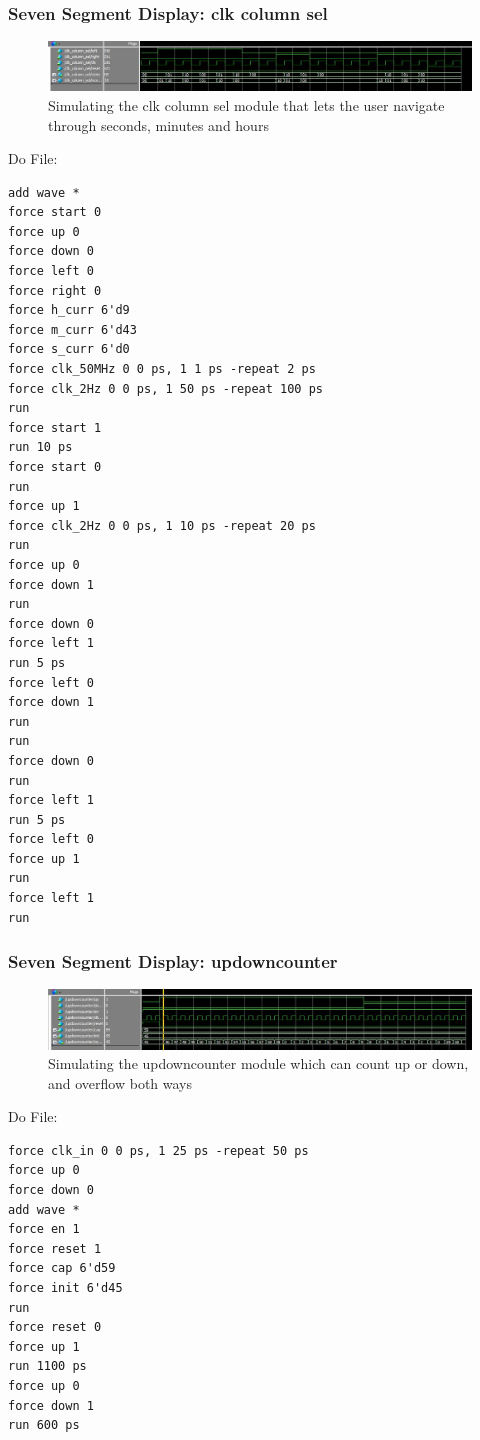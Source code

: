 \documentclass[a4paper]{article}
\begin{document}
\subsubsection{Seven Segment Display: clk column sel}
\begin{figure}[H]
    \includegraphics[width=0.8 \linewidth]{images/clkcolumnselsim.jpg}
    \caption{Simulating the clk column sel module that lets the user navigate through seconds, minutes and hours}
    \label{clkcolumnselsim}
\end{figure}

Do File:
\begin{Verbatim}
add wave *
force start 0
force up 0
force down 0
force left 0
force right 0
force h_curr 6'd9
force m_curr 6'd43
force s_curr 6'd0
force clk_50MHz 0 0 ps, 1 1 ps -repeat 2 ps
force clk_2Hz 0 0 ps, 1 50 ps -repeat 100 ps
run
force start 1
run 10 ps
force start 0
run
force up 1
force clk_2Hz 0 0 ps, 1 10 ps -repeat 20 ps
run
force up 0
force down 1
run
force down 0
force left 1
run 5 ps
force left 0
force down 1
run
run
force down 0
run
force left 1
run 5 ps
force left 0
force up 1
run
force left 1
run
\end{Verbatim}

\subsubsection{Seven Segment Display: updowncounter}
\begin{figure}[H]
    \includegraphics[width=0.8 \linewidth]{images/updowncountersim.JPG}
    \caption{Simulating the updowncounter module which can count up or down, and overflow both ways}
    \label{updowncounter_sim}
\end{figure}

Do File:
\begin{Verbatim}
force clk_in 0 0 ps, 1 25 ps -repeat 50 ps
force up 0
force down 0
add wave *
force en 1
force reset 1
force cap 6'd59
force init 6'd45
run
force reset 0
force up 1
run 1100 ps
force up 0
force down 1
run 600 ps
\end{Verbatim}

%
\end{document}
